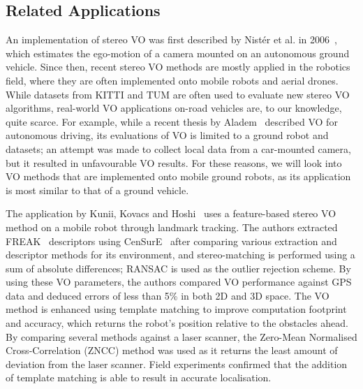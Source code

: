 \subsection{Related Applications}
An implementation of stereo VO was first described by Nistér et al. in 2006~\cite{nister_visual_2006}, which estimates the ego-motion of a camera mounted on an autonomous ground vehicle. Since then, recent stereo VO methods are mostly applied in the robotics field, where they are often implemented onto mobile robots and aerial drones. While datasets from KITTI and TUM are often used to evaluate new stereo VO algorithms, real-world VO applications on-road vehicles are, to our knowledge, quite scarce. For example, while a recent thesis by Aladem~\cite{aladem_robust_2017} described VO for autonomous driving, its evaluations of VO is limited to a ground robot and datasets; an attempt was made to collect local data from a car-mounted camera, but it resulted in unfavourable VO results. For these reasons, we will look into VO methods that are implemented onto mobile ground robots, as its application is most similar to that of a ground vehicle. 

The application by Kunii, Kovacs and Hoshi~\cite{kunii_mobile_2017} uses a feature-based stereo VO method on a mobile robot through landmark tracking. The authors extracted FREAK~\cite{alahi_freak:_2012} descriptors using CenSurE~\cite{agrawal_censure:_2008} after comparing various extraction and descriptor methods for its environment, and stereo-matching is performed using a sum of absolute differences; RANSAC is used as the outlier rejection scheme. By using these VO parameters, the authors compared VO performance against GPS data and deduced errors of less than 5\% in both 2D and 3D space. The VO method is enhanced using template matching to improve computation footprint and accuracy, which returns the robot's position relative to the obstacles ahead. By comparing several methods against a laser scanner, the Zero-Mean Normalised Cross-Correlation (ZNCC) method was used as it returns the least amount of deviation from the laser scanner. Field experiments confirmed that the addition of template matching is able to result in accurate localisation. 




